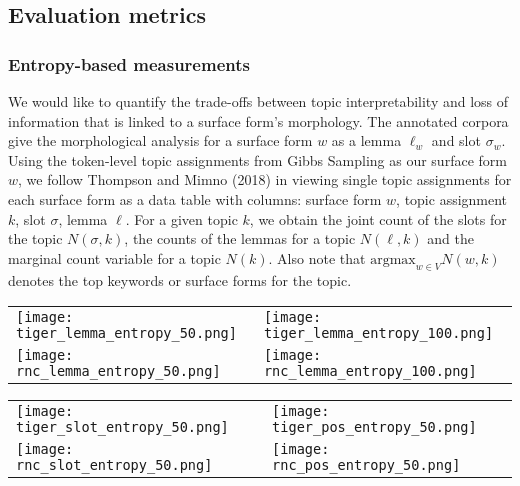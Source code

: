 \documentclass[11pt,a4paper]{article}
\newcommand{\argmax}{\mathrm{argmax}}
\begin{document}
\subsection{Evaluation metrics}

\subsubsection{Entropy-based measurements}
We would like to quantify the trade-offs between topic interpretability and loss of information that is linked to a surface form's morphology. The annotated corpora give the morphological analysis for a surface form $w$ as a lemma $\ell_w$ and slot $\sigma_w$. Using the token-level topic assignments from Gibbs Sampling as our surface form $w$, we follow Thompson and Mimno (2018) in viewing single topic assignments for each surface form as a data table with columns: surface form $w$, topic assignment $k$, slot $\sigma$, lemma $\ell$. For a given topic $k$, we obtain the joint count of the slots for the topic $N(\sigma, k)$, the counts of the lemmas for a topic $N(\ell, k)$ and the marginal count variable for a topic $N(k)$. Also note that $\argmax_{w \in V} N(w, k)$ denotes the top keywords or surface forms for the topic.

\begin{figure*}[t]
    \label{fig:lemmaentropy}
    \begin{tabular}{ll}
        \texttt{[image: tiger\_lemma\_entropy\_50.png]} &
        \texttt{[image: tiger\_lemma\_entropy\_100.png]} \\
        \texttt{[image: rnc\_lemma\_entropy\_50.png]} &
        \texttt{[image: rnc\_lemma\_entropy\_100.png]}
    \end{tabular}
\end{figure*}


\begin{figure*}[t]
    \label{fig:slotentropy}
    \begin{tabular}{ll}
        \texttt{[image: tiger\_slot\_entropy\_50.png]} &
        \texttt{[image: tiger\_pos\_entropy\_50.png]} \\
        \texttt{[image: rnc\_slot\_entropy\_50.png]} &
        \texttt{[image: rnc\_pos\_entropy\_50.png]}
    \end{tabular}
\end{figure*}
\end{document}
